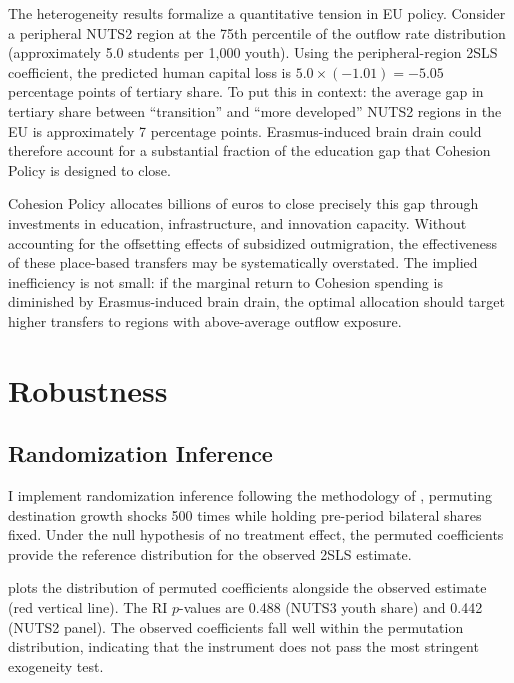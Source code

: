 \documentclass[12pt]{article}
\begin{document}
The heterogeneity results formalize a quantitative tension in EU policy. Consider a peripheral NUTS2 region at the 75th percentile of the outflow rate distribution (approximately 5.0 students per 1,000 youth). Using the peripheral-region 2SLS coefficient, the predicted human capital loss is $5.0 \times (-1.01) = -5.05$ percentage points of tertiary share. To put this in context: the average gap in tertiary share between ``transition'' and ``more developed'' NUTS2 regions in the EU is approximately 7 percentage points. Erasmus-induced brain drain could therefore account for a substantial fraction of the education gap that Cohesion Policy is designed to close.

Cohesion Policy allocates billions of euros to close precisely this gap through investments in education, infrastructure, and innovation capacity. Without accounting for the offsetting effects of subsidized outmigration, the effectiveness of these place-based transfers may be systematically overstated. The implied inefficiency is not small: if the marginal return to Cohesion spending is diminished by Erasmus-induced brain drain, the optimal allocation should target higher transfers to regions with above-average outflow exposure.


\section{Robustness}
\label{sec:robustness}

\subsection{Randomization Inference}

I implement randomization inference following the methodology of \citet{borusyak_hull_jaravel_2022}, permuting destination growth shocks 500 times while holding pre-period bilateral shares fixed. Under the null hypothesis of no treatment effect, the permuted coefficients provide the reference distribution for the observed 2SLS estimate.

 plots the distribution of permuted coefficients alongside the observed estimate (red vertical line). The RI $p$-values are 0.488 (NUTS3 youth share) and 0.442 (NUTS2 panel). The observed coefficients fall well within the permutation distribution, indicating that the instrument does not pass the most stringent exogeneity test.
\end{document}
